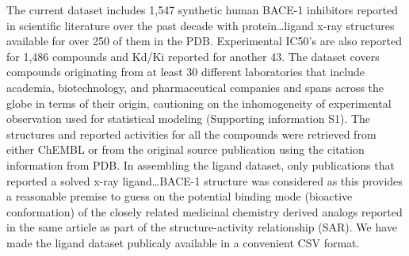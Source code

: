 The current dataset includes 1,547 synthetic human BACE-1 inhibitors reported in scientific literature over the past decade with protein…ligand x-ray structures available for over 250 of them in the PDB.  Experimental IC50’s are also reported for 1,486 compounds and Kd/Ki reported for another 43.  The dataset covers compounds originating from at least 30 different laboratories that include academia, biotechnology, and pharmaceutical companies and spans across the globe in terms of their origin, cautioning on the inhomogeneity of experimental observation used for statistical modeling (Supporting information S1).  The structures and reported activities for all the compounds were retrieved from either ChEMBL or from the original source publication using the citation information from PDB.  In assembling the ligand dataset, only publications that reported a solved x-ray ligand…BACE-1 structure was considered as this provides a reasonable premise to guess on the potential binding mode (bioactive conformation) of the closely related medicinal chemistry derived analogs reported in the same article as part of the structure-activity relationship (SAR).  We have made the ligand dataset publicaly available in a convenient CSV format.

